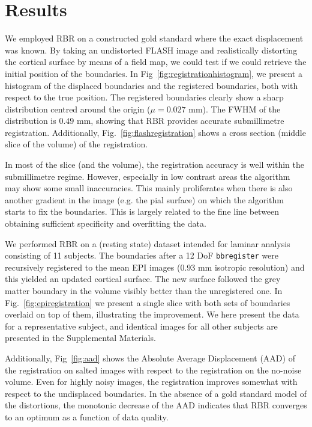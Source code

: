 \section*{Results}
We employed RBR on a constructed gold standard where the exact displacement was known. By taking an undistorted FLASH image and realistically distorting the cortical surface by means of a field map, we could test if we could retrieve the initial position of the boundaries. In Fig~\ref{fig:registrationhistogram}, we present a histogram of the displaced boundaries and the registered boundaries, both with respect to the true position. The registered boundaries clearly show a sharp distribution centred around the origin ($\mu=0.027$ mm). The FWHM of the distribution is $0.49$ mm, showing that RBR provides accurate submillimetre registration. Additionally, Fig.~\ref{fig:flashregistration} shows a cross section (middle slice of the volume) of the registration.



In most of the slice (and the volume), the registration accuracy is well within the submillimetre regime. However, especially in low contrast areas the algorithm may show some small inaccuracies. This mainly proliferates when there is also another gradient in the image (e.g. the pial surface) on which the algorithm starts to fix the boundaries. This is largely related to the fine line between obtaining sufficient specificity and overfitting the data.

We performed RBR on a (resting state) dataset intended for laminar analysis consisting of 11 subjects. The boundaries after a 12 DoF \texttt{bbregister} were recursively registered to the mean EPI images (0.93 mm isotropic resolution) and this yielded an updated cortical surface. The new surface followed the grey matter boundary in the volume visibly better than the unregistered one. In Fig.~\ref{fig:epiregistration} we present a single slice with both sets of boundaries overlaid on top of them, illustrating the improvement. We here present the data for a representative subject, and identical images for all other subjects are presented in the Supplemental Materials.


Additionally, Fig~\ref{fig:aad} shows the Absolute Average Displacement (AAD) of the registration on salted images with respect to the registration on the no-noise volume. Even for highly noisy images, the registration improves somewhat with respect to the undisplaced boundaries. In the absence of a gold standard model of the distortions, the monotonic decrease of the AAD indicates that RBR converges to an optimum as a function of data quality.


